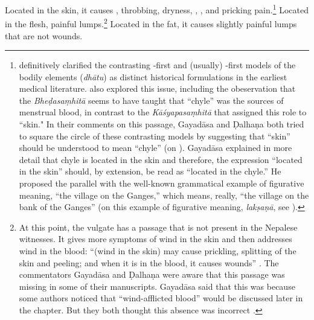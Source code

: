\begin{translation}
\item[25abc--29] 

Located in the skin, it causes ,
throbbing, dryness, , ,
and pricking pain.\footnote{\citet{maas-2008} definitively clarified
    the contrasting -first and (usually) -first models
    of the bodily elements (\emph{dhātu}) as
    distinct historical formulations in the earliest medical literature.
    \cite[267--282]{das-2003} also explored this issue, including the
    obeservation that the \emph{Bheḍasaṃhitā} seems to have taught that
     “chyle”  was the sources of menstrual blood, in contrast to
    the \emph{Kāśyapasaṃhitā} that assigned this role to 
    “skin." In their comments on this passage, Gayadāsa and Ḍalhaṇa both
    tried to square the circle of these contrasting models by suggesting
    that  “skin” should be understood to mean  “chyle”
    (on ). Gayadāsa explained in more detail that chyle is
    located in the skin and therefore, the expression 
    “located in the skin” should, by extension, be read as 
    “located in the chyle.”  He proposed the parallel with the well-known
    grammatical example of figurative meaning,  “the
    village on the Ganges,” which means, really, “the village on the bank
    of the Ganges” (on this example of figurative meaning, \emph{lakṣaṇā},
    see \cites[698--699]{jhal-1978}[ch.\,6]{kunj-1963}).  } Located in the
    flesh, painful lumps.\footnote{At this point, the vulgate has a
        passage that is not present in the Nepalese witnesses.  It gives more
        symptoms of wind in the skin and then addresses wind in the blood:
        “(wind in the skin) may cause prickling, splitting of the skin and
        peeling; and when it is in the blood, it causes wounds”
        \citep[261]{vulgate}. \label{ancient-variants}The commentators
        Gayadāsa and Ḍalhaṇa were aware that this passage was missing in some
        of their manuscripts. Gayadāsa said that this was because some authors
        noticed that  “wind-afflicted blood” would be discussed 
        later in
        the chapter. But they both thought this absence was incorrect
        \citep[262]{vulgate}.} Located in the fat, it causes slightly painful
        lumps that are not wounds.
        

\end{translation}
